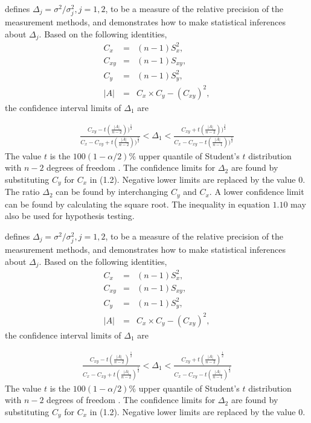 \documentclass[12pt, a4paper]{report}
\theoremstyle{plain}
\theoremstyle{definition}
\theoremstyle{remark}
\begin{document}
\citet{Thompson} defines $\Delta_j = \sigma^2 / \sigma^2_j, j=1,2$, to be a measure of the
relative precision of the measurement methods, and demonstrates how to make statistical inferences about $\Delta_{j}$.
Based on the following identities,
\begin{eqnarray*}
	C_{x}&=&(n-1)S^2_{x},\nonumber\\
	C_{xy}&=&(n-1)S_{xy},\nonumber\\
	C_{y}&=&(n-1)S^2_{y},\nonumber\\
	|A| &=& C_{x}\times C_{y} - (C_{xy})^2,\nonumber
\end{eqnarray*}
\noindent the confidence interval limits of $\Delta_{1}$ are

\begin{eqnarray}
\frac{C_{xy}-
	t(\frac{|A|}{n-2}))^{\frac{1}{2}}}{C_{x}-C_{xy}+
	t(\frac{|A|}{n-2}))^{\frac{1}{2}}} <
\Delta_{1} < \frac{C_{xy}+
	t(\frac{|A|}{n-2}))^{\frac{1}{2}}}{C_{x}-C_{xy}-
	t(\frac{|A|}{n-1}))^{\frac{1}{2}}} \nonumber
\end{eqnarray}
The value $t$ is the $100(1-\alpha/2)\%$ upper quantile of
Student's $t$ distribution with $n-2$ degrees of freedom
\citep{Kinsella}. The confidence limits for $\Delta_{2}$ are found by substituting $C_{y}$ for $C_{x}$ in (1.2).
Negative lower limits are replaced by the value $0$.
The ratio $\Delta_{2}$
can be found by interchanging $C_{y}$ and $C_{x}$. A lower
confidence limit can be found by calculating the square root. The
inequality in equation $1.10$ may also be used for hypothesis
testing.

\citet{Thompson} defines $\Delta_j = \sigma^2 / \sigma^2_j, j=1,2$, to be a measure of the
relative precision of the measurement methods, and demonstrates how to make statistical inferences about $\Delta_{j}$.
Based on the following identities,
\begin{eqnarray*}
	C_{x}&=&(n-1)S^2_{x},\nonumber\\
	C_{xy}&=&(n-1)S_{xy},\nonumber\\
	C_{y}&=&(n-1)S^2_{y},\nonumber\\
	|A| &=& C_{x}\times C_{y} - (C_{xy})^2,\nonumber
\end{eqnarray*}
\noindent the confidence interval limits of $\Delta_{1}$ are

\begin{eqnarray}
\frac{C_{xy}-
	t(\frac{|A|}{n-2})^{\frac{1}{2}}}{C_{x}-C_{xy}+
	t(\frac{|A|}{n-2})^{\frac{1}{2}}} <
\Delta_{1} < \frac{C_{xy}+
	t(\frac{|A|}{n-2})^{\frac{1}{2}}}{C_{x}-C_{xy}-
	t(\frac{|A|}{n-1})^{\frac{1}{2}}} \nonumber
\end{eqnarray}
The value $t$ is the $100(1-\alpha/2)\%$ upper quantile of
Student's $t$ distribution with $n-2$ degrees of freedom
\citep{Kinsella}. The confidence limits for $\Delta_{2}$ are found by substituting $C_{y}$ for $C_{x}$ in (1.2).
Negative lower limits are replaced by the value $0$.
\end{document}
